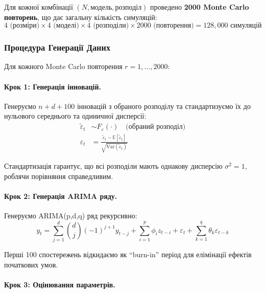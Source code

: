 \documentclass[12pt,a4paper]{article}
\begin{document}
	Для кожної комбінації $(N, \text{модель}, \text{розподіл})$ проведено \textbf{2000 Monte Carlo повторень}, що дає загальну кількість симуляцій:
	\begin{equation}
		\label{eq:total_simulations}
		4 \text{ (розміри)} \times 4 \text{ (моделі)} \times 4 \text{ (розподіли)} \times 2000 \text{ (повторення)} = 128{,}000 \text{ симуляцій}
	\end{equation}
	
	\subsubsection{Процедура Генерації Даних}
	
	Для кожного Monte Carlo повторення $r = 1, \ldots, 2000$:
	
	\paragraph{Крок 1: Генерація інновацій.}
	
	Генеруємо $n + d + 100$ інновацій з обраного розподілу та стандартизуємо їх до нульового середнього та одиничної дисперсії:
	\begin{align}
		\tilde{\varepsilon}_t &\sim F_{\varepsilon}(\cdot) \quad \text{(обраний розподіл)} \label{eq:raw_innovations} \\
		\varepsilon_t &= \frac{\tilde{\varepsilon}_t - \mathbb{E}[\tilde{\varepsilon}_t]}{\sqrt{\text{Var}(\tilde{\varepsilon}_t)}} \label{eq:standardized_innovations}
	\end{align}
	
	Стандартизація гарантує, що всі розподіли мають однакову дисперсію $\sigma^2 = 1$, роблячи порівняння справедливим.
	
	\paragraph{Крок 2: Генерація ARIMA ряду.}
	
	Генеруємо ARIMA(p,d,q) ряд рекурсивно:
	\begin{equation}
		\label{eq:arima_generation}
		y_t = \sum_{j=1}^{d} \binom{d}{j} (-1)^{j+1} y_{t-j} + \sum_{i=1}^{p} \phi_i z_{t-i} + \varepsilon_t + \sum_{k=1}^{q} \theta_k \varepsilon_{t-k}
	\end{equation}
	
	Перші 100 спостережень відкидаємо як ``burn-in'' період для елімінації ефектів початкових умов.
	
	\paragraph{Крок 3: Оцінювання параметрів.}
	
\end{document}
